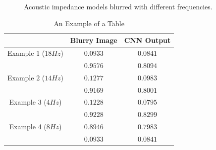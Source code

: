 \documentclass[conference,compsoc]{IEEEtran}
\begin{document}
\begin{figure}[!t]
{\label{fig_scenario5_blurred}}
\hfil
{}
\caption{Acoustic impedance models blurred with different frequencies.}
\label{fig_scenario5}
\end{figure}


\begin{table}[!t]
\renewcommand{\arraystretch}{1.3}
\caption{An Example of a Table}
\label{table_caso_5}
\centering
\begin{tabular}{|c||c||c|}
\hline
 & Blurry Image & CNN Output \\
\hline
Example 1 ($18Hz$) & $0.0933$ & $0.0841$\\
\hline
	  & $0.9576$ & $0.8094$\\
\hline
Example 2 ($14Hz$)& $0.1277$ & $0.0983$ \\
\hline
	  & $0.9169$ & $0.8001$\\
\hline
Example 3 ($4Hz$)& $0.1228$ & $0.0795$\\
\hline
	  & $0.9228$ & $0.8299$\\
\hline
Example 4 ($8Hz$)& $0.8946$ & $0.7983$\\
\hline
  & $0.0933$ & $0.0841$\\
\hline
\end{tabular}
\end{table}
\end{document}
